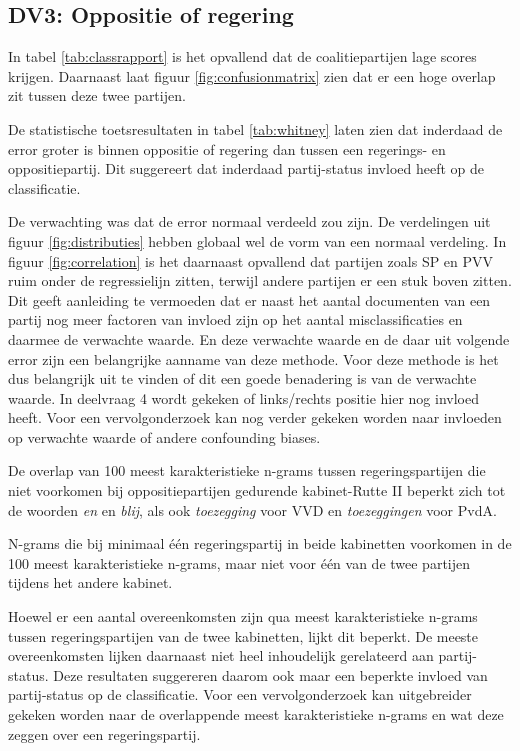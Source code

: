 \subsection{DV3: Oppositie of regering}
In tabel \ref{tab:classrapport} is het opvallend dat de coalitiepartijen lage scores krijgen. Daarnaast laat figuur \ref{fig:confusionmatrix} zien dat er een hoge overlap zit tussen deze twee partijen.\par
De statistische toetsresultaten in tabel \ref{tab:whitney} laten zien dat inderdaad de error groter is binnen oppositie of regering dan tussen een regerings- en oppositiepartij. Dit suggereert dat inderdaad partij-status invloed heeft op de classificatie. \par
De verwachting was dat de error normaal verdeeld zou zijn. De verdelingen uit figuur \ref{fig:distributies} hebben globaal wel de vorm van een normaal verdeling. In figuur \ref{fig:correlation} is het daarnaast opvallend dat partijen zoals SP en PVV ruim onder de regressielijn zitten, terwijl andere partijen er een stuk boven zitten. Dit geeft aanleiding te vermoeden dat er naast het aantal documenten van een partij nog meer factoren van invloed zijn op het aantal misclassificaties en daarmee de verwachte waarde. En deze verwachte waarde en de daar uit volgende error zijn een belangrijke aanname van deze methode. Voor deze methode is het dus belangrijk uit te vinden of dit een goede benadering is van de verwachte waarde. In deelvraag 4 wordt gekeken of links/rechts positie hier nog invloed heeft. Voor een vervolgonderzoek kan nog verder gekeken worden naar invloeden op verwachte waarde of andere confounding biases.\par
De overlap van 100 meest karakteristieke n-grams tussen regeringspartijen die niet voorkomen bij oppositiepartijen gedurende kabinet-Rutte II beperkt zich tot de woorden \textit{en} en \textit{blij}, als ook \textit{toezegging} voor VVD en \textit{toezeggingen} voor PvdA.\par
\begin{table}[H]
\label{tab:overlapkabinetten}
\caption{N-grams die bij minimaal één regeringspartij in beide kabinetten voorkomen in de 100 meest karakteristieke n-grams, maar niet voor één van de twee partijen tijdens het andere kabinet.}
\centering
 
\end{table}
Hoewel er een aantal overeenkomsten zijn qua meest karakteristieke n-grams tussen regeringspartijen van de twee kabinetten, lijkt dit beperkt. De meeste overeenkomsten lijken daarnaast niet heel inhoudelijk gerelateerd aan partij-status. Deze resultaten suggereren daarom ook maar een beperkte invloed van partij-status op de classificatie. Voor een vervolgonderzoek kan uitgebreider gekeken worden naar de overlappende meest karakteristieke n-grams en wat deze zeggen over een regeringspartij.\par
